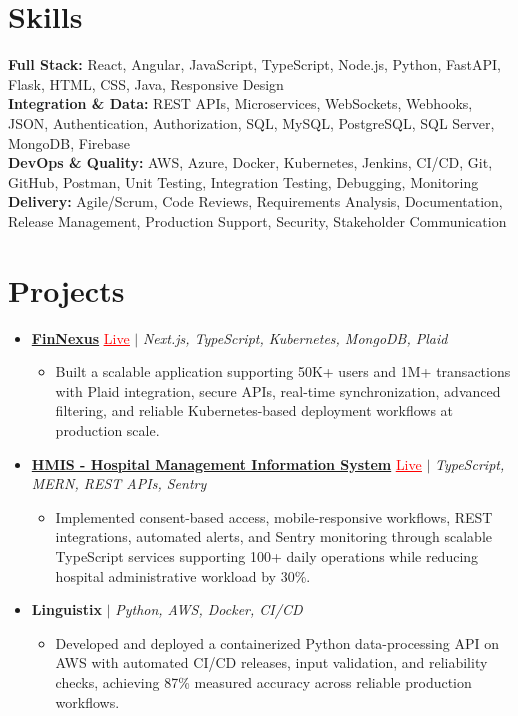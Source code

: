 \documentclass[letterpaper,10pt]{article}
\newcommand{\itemTail}{\vspace{-4pt}}
\newcommand{\sectionGap}{\vspace{-8pt}}
\newcommand{\projGap}{\vspace{3pt}}
\newcommand{\resumeItem}[1]{\item\small{{#1 \itemTail}}}
\newcommand{\resumeProjectHeading}[1]{\item \small #1 \vspace{-2pt}}
\newcommand{\resumeProjectLink}[2]{\href{#1}{\textcolor{red}{\underline{#2}}}}
\newcommand{\resumeSubHeadingListStart}{\begin{itemize}[leftmargin=0.0in, label={}]}
\newcommand{\resumeSubHeadingListEnd}{\end{itemize}}
\newcommand{\resumeProjItemListStart}{\begin{itemize}[leftmargin=0.15in,label=\textbullet,itemsep=3pt,topsep=0pt,parsep=0pt,partopsep=0pt]}
\newcommand{\resumeProjItemListEnd}{\end{itemize}\vspace{-4pt}}
\begin{document}
\section{Skills}
\begin{itemize}[leftmargin=0.15in, label={}]
\small{\item{
\textbf{Full Stack:} React, Angular, JavaScript, TypeScript, Node.js, Python, FastAPI, Flask, HTML, CSS, Java, Responsive Design \\
\textbf{Integration \& Data:} REST APIs, Microservices, WebSockets, Webhooks, JSON, Authentication, Authorization, SQL, MySQL, PostgreSQL, SQL Server, MongoDB, Firebase \\
\textbf{DevOps \& Quality:} AWS, Azure, Docker, Kubernetes, Jenkins, CI/CD, Git, GitHub, Postman, Unit Testing, Integration Testing, Debugging, Monitoring \\
\textbf{Delivery:} Agile/Scrum, Code Reviews, Requirements Analysis, Documentation, Release Management, Production Support, Security, Stakeholder Communication
}}
\end{itemize}
\sectionGap
\section{Projects}
\resumeSubHeadingListStart
\vspace{-2pt}
\resumeProjectHeading{\href{https://fin-nexus.vercel.app/}{\textbf{FinNexus}} \resumeProjectLink{https://fin-nexus.vercel.app/}{Live} $|$ \emph{Next.js, TypeScript, Kubernetes, MongoDB, Plaid}}
\resumeProjItemListStart
\resumeItem{Built a scalable application supporting 50K+ users and 1M+ transactions with Plaid integration, secure APIs, real-time synchronization, advanced filtering, and reliable Kubernetes-based deployment workflows at production scale.}
\resumeProjItemListEnd
\projGap
\resumeProjectHeading{\href{https://hims-rouge.vercel.app/}{\textbf{HMIS - Hospital Management Information System}} \resumeProjectLink{https://hims-rouge.vercel.app/}{Live} $|$ \emph{TypeScript, MERN, REST APIs, Sentry}}
\resumeProjItemListStart
\resumeItem{Implemented consent-based access, mobile-responsive workflows, REST integrations, automated alerts, and Sentry monitoring through scalable TypeScript services supporting 100+ daily operations while reducing hospital administrative workload by 30\%.}
\resumeProjItemListEnd
\projGap
\resumeProjectHeading{\textbf{Linguistix} $|$ \emph{Python, AWS, Docker, CI/CD}}
\resumeProjItemListStart
\resumeItem{Developed and deployed a containerized Python data-processing API on AWS with automated CI/CD releases, input validation, and reliability checks, achieving 87\% measured accuracy across reliable production workflows.}
\resumeProjItemListEnd
\resumeSubHeadingListEnd
\end{document}
